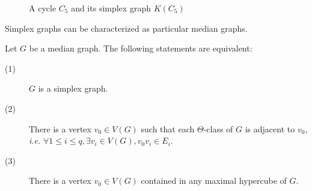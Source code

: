 \documentclass[a4paper,UKenglish,numberwithinsect,cleveref, autoref,anonymous]{lipics-v2021}
\begin{document}
\begin{figure}[h]
\begin{subfigure}[b]{0.49\columnwidth}
\centering
\scalebox{0.7}{}
\end{subfigure}
\begin{subfigure}[b]{0.49\columnwidth}
\centering
\scalebox{0.7}{}
\end{subfigure}
\caption{A cycle $C_5$ and its simplex graph $K(C_5)$}
\label{fig:example_simplex}
\end{figure}

Simplex graphs can be characterized as particular median graphs.

\begin{theorem}
Let $G$ be a median graph. The following statements are equivalent:
\begin{description}
    \item[(1)] $G$ is a simplex graph.
    \item[(2)] There is a vertex $v_0 \in V(G)$ such that each $\Theta$-class of $G$ is adjacent to $v_0$, {\em i.e.} $\forall 1\le i\le q, \exists v_i\in V(G), v_0v_i \in E_i$.
    \item[(3)] There is a vertex $v_0 \in V(G)$ contained in any maximal hypercube of $G$.
\end{description}
\label{th:simplex}
\end{theorem}
\end{document}
